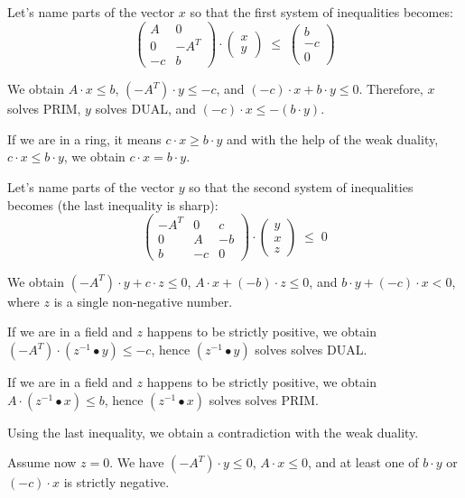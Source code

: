 \documentclass[]{article}
\begin{document}
Let's name parts of the vector $x$ so that the first system of inequalities becomes:
$$
\begin{pmatrix}
	A & 0 \\
	0 & -A^T \\
	-c & b
\end{pmatrix}
\cdot
\begin{pmatrix}
	x \\
	y
\end{pmatrix}
\;\le\;
\begin{pmatrix}
	b \\
	-c \\
	0
\end{pmatrix}
$$

We obtain $A \cdot x \le b$, $(-A^T) \cdot y \le -c$, and
$(-c) \cdot x + b \cdot y \le 0$.
Therefore, $x$ solves PRIM, $y$ solves DUAL, and
$(-c) \cdot x \le -(b \cdot y)$.

If we are in a ring, it means $c \cdot x \ge b \cdot y$ and
with the help of the weak duality, $c \cdot x \le b \cdot y$,
we obtain $c \cdot x = b \cdot y$.
\bigskip

Let's name parts of the vector $y$ so that the second system of inequalities becomes
(the last inequality is sharp):
$$
\begin{pmatrix}
	-A^T & 0 & c \\
	0 & A & -b \\
	b & -c & 0
\end{pmatrix}
\cdot
\begin{pmatrix}
	y \\
	x \\
	z
\end{pmatrix}
\;\le\;
0
$$

We obtain $(-A^T) \cdot y + c \cdot z \le 0$,
$A \cdot x + (-b) \cdot z \le 0$, and
$b \cdot y + (-c) \cdot x < 0$, where
$z$ is a single non-negative number.

If we are in a field and $z$ happens to be strictly positive, we obtain
$(-A^T) \cdot (z^{-1} \bullet y) \le -c$,
hence $(z^{-1} \bullet y)$ solves solves DUAL.

If we are in a field and $z$ happens to be strictly positive, we obtain
$A \cdot (z^{-1} \bullet x) \le b$,
hence $(z^{-1} \bullet x)$ solves solves PRIM.

Using the last inequality, we obtain a contradiction with the weak duality.

Assume now $z = 0$.
We have $(-A^T) \cdot y \le 0$, $A \cdot x \le 0$, and
at least one of $b \cdot y$ or $(-c) \cdot x$ is strictly negative.
\end{document}
